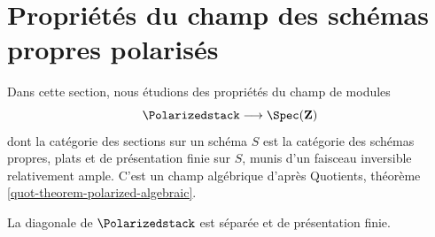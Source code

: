 \section{Propriétés du champ des schémas propres polarisés}
\label{section-polarized}

\noindent
Dans cette section, nous étudions des propriétés du champ de modules
$$
\Polarizedstack \longrightarrow \Spec(\mathbf{Z})
$$
dont la catégorie des sections sur un schéma $S$ est la catégorie des
schémas propres, plats et de présentation finie sur $S$, munis d'un
faisceau inversible relativement ample. C'est un champ algébrique d'après
Quotients, théorème \ref{quot-theorem-polarized-algebraic}.

\begin{lemma}
\label{lemma-polarized-diagonal-separated-fp}
La diagonale de $\Polarizedstack$ est séparée et de présentation finie.
\end{lemma}

